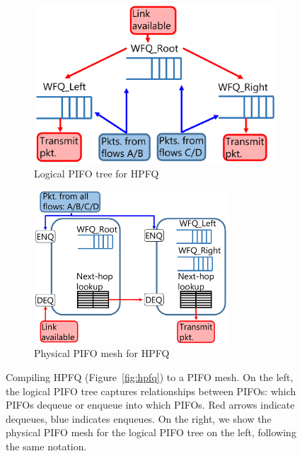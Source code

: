 \begin{figure}[!t]
  \begin{subfigure}[b]{0.5\textwidth}
  \begin{center}
  \includegraphics[width=\textwidth]{pifo_hpfq_logical.pdf}
  \caption{Logical PIFO tree for HPFQ}
  \label{fig:hpfq_path}
  \end{center}
  \end{subfigure}
  \begin{subfigure}[b]{0.5\textwidth}
  \begin{center}
  \includegraphics[width=0.8\textwidth]{pifo_hpfq_physical.pdf}
  \caption{Physical PIFO mesh for HPFQ}
  \label{fig:hpfq_mesh}
  \end{center}
  \end{subfigure}
  \caption{Compiling HPFQ (Figure~\ref{fig:hpfq}) to a PIFO mesh. On the left,
  the logical PIFO tree captures relationships between PIFOs: which PIFOs dequeue
  or enqueue into which PIFOs. Red arrows indicate dequeues, blue indicates
  enqueues.  On the right, we show the physical PIFO mesh for the logical PIFO
  tree on the left, following the same notation.}
  \label{fig:hpfq_compiling}
\end{figure}

